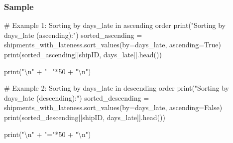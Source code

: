 \documentclass[
  letterpaper,
  DIV=11,
  numbers=noendperiod]{scrartcl}
\newenvironment{Shaded}{\begin{snugshade}}{\end{snugshade}}
\newcommand{\BuiltInTok}[1]{\textcolor[rgb]{0.00,0.23,0.31}{#1}}
\newcommand{\CharTok}[1]{\textcolor[rgb]{0.13,0.47,0.30}{#1}}
\newcommand{\CommentTok}[1]{\textcolor[rgb]{0.37,0.37,0.37}{#1}}
\newcommand{\DecValTok}[1]{\textcolor[rgb]{0.68,0.00,0.00}{#1}}
\newcommand{\NormalTok}[1]{\textcolor[rgb]{0.00,0.23,0.31}{#1}}
\newcommand{\OperatorTok}[1]{\textcolor[rgb]{0.37,0.37,0.37}{#1}}
\newcommand{\StringTok}[1]{\textcolor[rgb]{0.13,0.47,0.30}{#1}}
\newcommand{\VariableTok}[1]{\textcolor[rgb]{0.07,0.07,0.07}{#1}}
\begin{document}
\begin{tcolorbox}
\subsubsection{Sample}\label{sample}

\begin{Shaded}
\begin{Highlighting}[]
\CommentTok{\# Example 1: Sorting by days\_late in ascending order}
\BuiltInTok{print}\NormalTok{(}\StringTok{"Sorting by days\_late (ascending):"}\NormalTok{)}
\NormalTok{sorted\_ascending }\OperatorTok{=}\NormalTok{ shipments\_with\_lateness.sort\_values(by}\OperatorTok{=}\StringTok{\textquotesingle{}days\_late\textquotesingle{}}\NormalTok{, ascending}\OperatorTok{=}\VariableTok{True}\NormalTok{)}
\BuiltInTok{print}\NormalTok{(sorted\_ascending[[}\StringTok{\textquotesingle{}shipID\textquotesingle{}}\NormalTok{, }\StringTok{\textquotesingle{}days\_late\textquotesingle{}}\NormalTok{]].head())}

\BuiltInTok{print}\NormalTok{(}\StringTok{"}\CharTok{\textbackslash{}n}\StringTok{"} \OperatorTok{+} \StringTok{"="}\OperatorTok{*}\DecValTok{50} \OperatorTok{+} \StringTok{"}\CharTok{\textbackslash{}n}\StringTok{"}\NormalTok{)}

\CommentTok{\# Example 2: Sorting by days\_late in descending order}
\BuiltInTok{print}\NormalTok{(}\StringTok{"Sorting by days\_late (descending):"}\NormalTok{)}
\NormalTok{sorted\_descending }\OperatorTok{=}\NormalTok{ shipments\_with\_lateness.sort\_values(by}\OperatorTok{=}\StringTok{\textquotesingle{}days\_late\textquotesingle{}}\NormalTok{, ascending}\OperatorTok{=}\VariableTok{False}\NormalTok{)}
\BuiltInTok{print}\NormalTok{(sorted\_descending[[}\StringTok{\textquotesingle{}shipID\textquotesingle{}}\NormalTok{, }\StringTok{\textquotesingle{}days\_late\textquotesingle{}}\NormalTok{]].head())}

\BuiltInTok{print}\NormalTok{(}\StringTok{"}\CharTok{\textbackslash{}n}\StringTok{"} \OperatorTok{+} \StringTok{"="}\OperatorTok{*}\DecValTok{50} \OperatorTok{+} \StringTok{"}\CharTok{\textbackslash{}n}\StringTok{"}\NormalTok{)}


\end{Highlighting}
\end{Shaded}
\end{tcolorbox}
\end{document}
